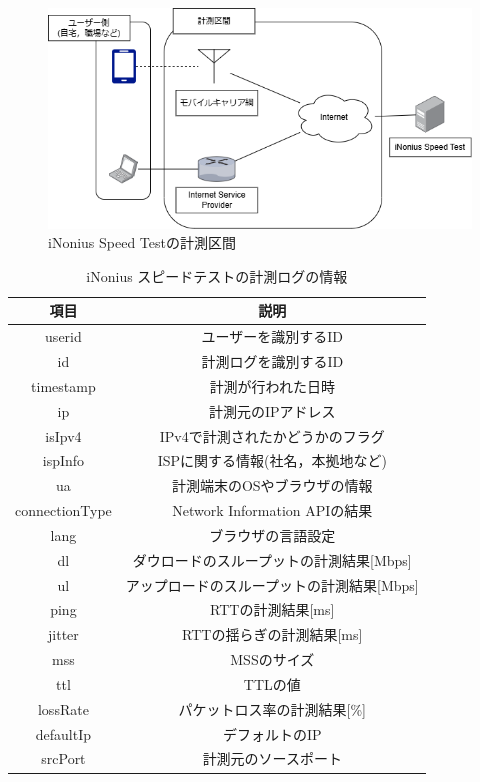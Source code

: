\begin{figure}[htbp]
    \centering
    \includegraphics[width=1.0\textwidth]{fig/Measurment.png}
    \caption{iNonius Speed Testの計測区間}
    \label{fig:Measurment}
\end{figure}
\FloatBarrier
\begin{table}[htbp]
    \caption{iNonius スピードテストの計測ログの情報}
    \label{tab:loginfo}
    \begin{center}
        \begin{tabular}{cc} \hline
            項目 & 説明 \\ \hline \hline
            userid & ユーザーを識別するID \\
            id & 計測ログを識別するID \\
            timestamp & 計測が行われた日時 \\
            ip & 計測元のIPアドレス \\
            isIpv4 & IPv4で計測されたかどうかのフラグ \\
            ispInfo & ISPに関する情報(社名，本拠地など) \\
            ua & 計測端末のOSやブラウザの情報 \\
            connectionType & Network Information APIの結果 \\
            lang & ブラウザの言語設定 \\
            dl & ダウロードのスループットの計測結果[Mbps] \\
            ul & アップロードのスループットの計測結果[Mbps] \\
            ping & RTTの計測結果[ms] \\
            jitter & RTTの揺らぎの計測結果[ms] \\
            mss & MSSのサイズ \\
            ttl & TTLの値 \\
            lossRate & パケットロス率の計測結果[\%] \\
            defaultIp & デフォルトのIP \\
            srcPort & 計測元のソースポート \\ \hline
        \end{tabular}
    \end{center}
\end{table}
\FloatBarrier

